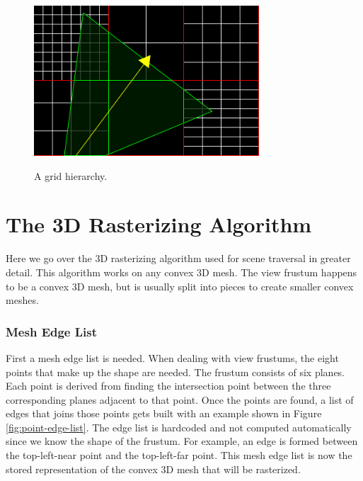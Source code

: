 \documentclass[12pt]{ucthesis}
\newcommand{\captionfonts}{\small\bf\ssp}
\begin{document}
\begin{figure}
\begin{center}
\includegraphics[width=0.75\textwidth]{Images/HierarchyCells.png}
\label{fig:grid-hierarchy}
\captionfonts
\caption[Grid Hierarchy]{A grid hierarchy.}
\end{center}
\end{figure}

\appendix

\chapter{The 3D Rasterizing Algorithm}
\label{rasterizing-algorithm}

Here we go over the 3D rasterizing algorithm used for scene traversal in greater detail.
This algorithm works on any convex 3D mesh.
The view frustum happens to be a convex 3D mesh, but is usually split into pieces to create smaller convex meshes. 

\subsection{Mesh Edge List}
\label{mesh-edge-list}

First a mesh edge list is needed.
When dealing with view frustums, the eight points that make up the shape are needed.
The frustum consists of six planes.
Each point is derived from finding the intersection point between the three corresponding planes adjacent to that point.
Once the points are found, a list of edges that joins those points gets built with an example shown in Figure \ref{fig:point-edge-list}.
The edge list is hardcoded and not computed automatically since we know the shape of the frustum.
For example, an edge is formed between the top-left-near point and the top-left-far point.
This mesh edge list is now the stored representation of the convex 3D mesh that will be rasterized.
\end{document}
